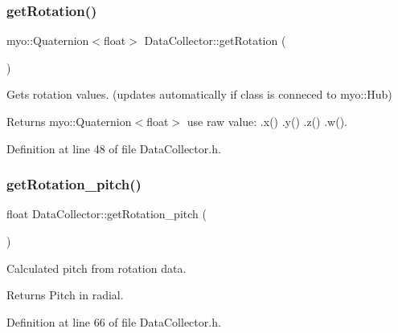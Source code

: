 \subsubsection{\texorpdfstring{get\+Rotation()}{getRotation()}}
{\footnotesize\ttfamily myo\+::\+Quaternion$<$float$>$ Data\+Collector\+::get\+Rotation (\begin{DoxyParamCaption}{ }\end{DoxyParamCaption})\hspace{0.3cm}{\ttfamily [inline]}}



Gets rotation values. (updates automatically if class is conneced to myo\+::\+Hub) 

\begin{DoxyReturn}{Returns}
myo\+::\+Quaternion$<$float$>$ use raw value\+: .x() .y() .z() .w(). 
\end{DoxyReturn}


Definition at line 48 of file Data\+Collector.\+h.

\mbox{\label{class_data_collector_a603dbbfb9d59838c775f51e1e695e638}} 
\subsubsection{\texorpdfstring{get\+Rotation\+\_\+pitch()}{getRotation\_pitch()}}
{\footnotesize\ttfamily float Data\+Collector\+::get\+Rotation\+\_\+pitch (\begin{DoxyParamCaption}{ }\end{DoxyParamCaption})\hspace{0.3cm}{\ttfamily [inline]}}



Calculated pitch from rotation data. 

\begin{DoxyReturn}{Returns}
Pitch in radial. 
\end{DoxyReturn}


Definition at line 66 of file Data\+Collector.\+h.

\mbox{\label{class_data_collector_a4e761ba292f93b5ac18e05a860a697ab}} 
